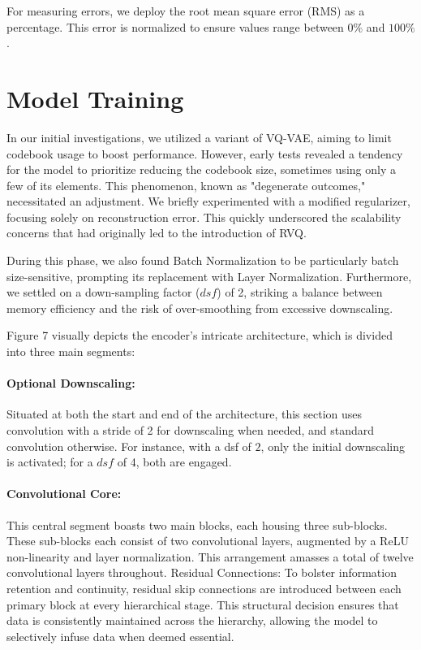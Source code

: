 \documentclass[runningheads]{llncs}
\begin{document}
For measuring errors, we deploy the root mean square error (RMS) as a percentage. This error is 
normalized to ensure values range between $0\%$ and $100\%$.

\section{Model Training}

In our initial investigations, we utilized a variant of VQ-VAE, aiming to limit codebook usage to boost 
performance. However, early tests revealed a tendency for the model to prioritize reducing the 
codebook size, sometimes using only a few of its elements. This phenomenon, known as "degenerate 
outcomes," necessitated an adjustment. We briefly experimented with a modified regularizer, 
focusing solely on reconstruction error. This quickly underscored the scalability concerns that had 
originally led to the introduction of RVQ. 
 
During this phase, we also found Batch Normalization to be particularly batch size-sensitive, 
prompting its replacement with Layer Normalization. Furthermore, we settled on a down-sampling 
factor ($dsf$) of 2, striking a balance between memory efficiency and the risk of over-smoothing from 
excessive downscaling. 


Figure 7 visually depicts the encoder's intricate architecture, which is divided into three main 
segments: 
 
\paragraph{Optional Downscaling:} Situated at both the start and end of the architecture, this section uses 
convolution with a stride of 2 for downscaling when needed, and standard convolution otherwise. For 
instance, with a dsf of $2$, only the initial downscaling is activated; for a $dsf$ of 4, both are engaged. 
 

\paragraph{Convolutional Core:} This central segment boasts two main blocks, each housing three sub-blocks. 
These sub-blocks each consist of two convolutional layers, augmented by a ReLU non-linearity and 
layer normalization. This arrangement amasses a total of twelve convolutional layers throughout. 
Residual Connections: To bolster information retention and continuity, residual skip connections are 
introduced between each primary block at every hierarchical stage. This structural decision ensures 
that data is consistently maintained across the hierarchy, allowing the model to selectively infuse data 
when deemed essential. 
\end{document}
